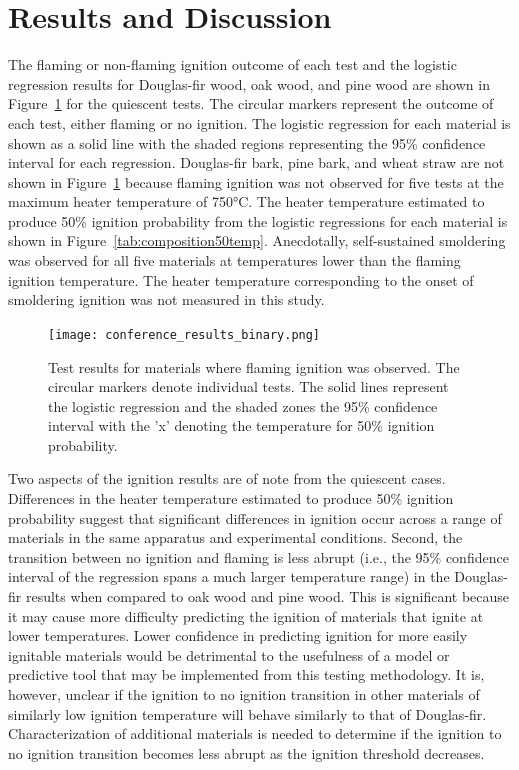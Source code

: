 \section{Results and Discussion}
    \label{sec:results3}
    The flaming or non-flaming ignition outcome of each test and the logistic regression results for Douglas-fir wood, oak wood, and pine wood are shown in Figure~\ref{fig:logistic_plot} for the quiescent tests. The circular markers represent the outcome of each test, either flaming or no ignition. The logistic regression for each material is shown as a solid line with the shaded regions representing the 95\% confidence interval for each regression. Douglas-fir bark, pine bark, and wheat straw are not shown in Figure~\ref{fig:logistic_plot} because flaming ignition was not observed for five tests at the maximum heater temperature of 750\si{\celsius}. The heater temperature estimated to produce 50\% ignition probability from the logistic regressions for each material is shown in Figure~\ref{tab:composition50temp}. Anecdotally, self-sustained smoldering was observed for all five materials at temperatures lower than the flaming ignition temperature. The heater temperature corresponding to the onset of smoldering ignition was not measured in this study. 
        \begin{figure}[htpb]
            \centering
            \texttt{[image: conference\_results\_binary.png]}
            \caption{Test results for materials where flaming ignition was observed. The circular markers denote individual tests. The solid lines represent the logistic regression and the shaded zones the 95\% confidence interval with the 'x' denoting the temperature for 50\% ignition probability.}
            \label{fig:logistic_plot}
        \end{figure}
    Two aspects of the ignition results are of note from the quiescent cases. Differences in the heater temperature estimated to produce 50\% ignition probability suggest that significant differences in ignition occur across a range of materials in the same apparatus and experimental conditions. Second, the transition between no ignition and flaming is less abrupt (i.e., the 95\% confidence interval of the regression spans a much larger temperature range) in the Douglas-fir results when compared to oak wood and pine wood. This is significant because it may cause more difficulty predicting the ignition of materials that ignite at lower temperatures. Lower confidence in predicting ignition for more easily ignitable materials would be detrimental to the usefulness of a model or predictive tool that may be implemented from this testing methodology. It is, however, unclear if the ignition to no ignition transition in other materials of similarly low ignition temperature will behave similarly to that of Douglas-fir. Characterization of additional materials is needed to determine if the ignition to no ignition transition becomes less abrupt as the ignition threshold decreases. 
    
